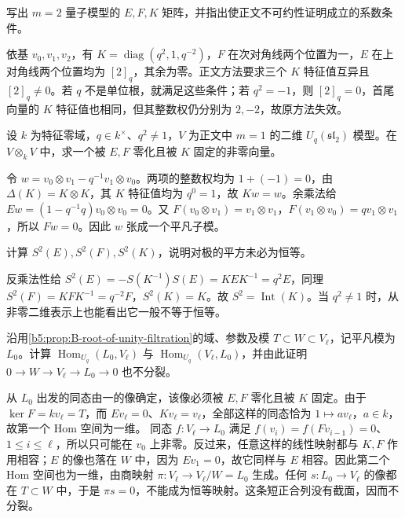 \begin{exercise}\label{b5:ex:B:02}
	写出 \(m=2\) 量子模型的 \(E,F,K\) 矩阵，并指出使正文不可约性证明成立的系数条件。
\end{exercise}
\begin{solution}
	依基 \(v_0,v_1,v_2\)，有 \(K=\operatorname{diag}(q^2,1,q^{-2})\)，\(F\) 在次对角线两个位置为一，\(E\) 在上对角线两个位置均为 \([2]_q\)，其余为零。正文方法要求三个 \(K\) 特征值互异且 \([2]_q\ne0\)。若 \(q\) 不是单位根，就满足这些条件；若 \(q^2=-1\)，则 \([2]_q=0\)，首尾向量的 \(K\) 特征值也相同，但其整数权仍分别为 \(2,-2\)，故原方法失效。
\end{solution}

\begin{exercise}\label{b5:ex:B:03}
	设 \(k\) 为特征零域，\(q\in k^\times\)、\(q^2\ne1\)，\(V\) 为正文中 \(m=1\) 的二维 \(U_q(\mathfrak{sl}_2)\) 模型。在 \(V\otimes_k V\) 中，求一个被 \(E,F\) 零化且被 \(K\) 固定的非零向量。
\end{exercise}
\begin{solution}
	令 \(w=v_0\otimes v_1-q^{-1}v_1\otimes v_0\)。两项的整数权均为 \(1+(-1)=0\)，由 \(\Delta(K)=K\otimes K\)，其 \(K\) 特征值均为 \(q^0=1\)，故 \(Kw=w\)。余乘法给 \(Ew=(1-q^{-1}q)v_0\otimes v_0=0\)。又 \(F(v_0\otimes v_1)=v_1\otimes v_1\)，\(F(v_1\otimes v_0)=qv_1\otimes v_1\)，所以 \(Fw=0\)。因此 \(w\) 张成一个平凡子模。
\end{solution}

\begin{exercise}\label{b5:ex:B:04}
	计算 \(S^2(E),S^2(F),S^2(K)\)，说明对极的平方未必为恒等。
\end{exercise}
\begin{solution}
	反乘法性给 \(S^2(E)=-S(K^{-1})S(E)=KEK^{-1}=q^2E\)，同理 \(S^2(F)=KFK^{-1}=q^{-2}F\)，\(S^2(K)=K\)。故 \(S^2=\operatorname{Int}(K)\)。当 \(q^2\ne1\) 时，从非零二维表示上也能看出它一般不等于恒等。
\end{solution}

\begin{exercise}\label{b5:ex:B:05}
	沿用\cref{b5:prop:B-root-of-unity-filtration}的域、参数及模 \(T\subset W\subset V_\ell\)，记平凡模为 \(L_0\)。计算 \(\operatorname{Hom}_{U_q}(L_0,V_\ell)\) 与 \(\operatorname{Hom}_{U_q}(V_\ell,L_0)\)，并由此证明 \(0\to W\to V_\ell\to L_0\to0\) 也不分裂。
\end{exercise}
\begin{solution}
	从 \(L_0\) 出发的同态由一的像确定，该像必须被 \(E,F\) 零化且被 \(K\) 固定。由于 \(\ker F=kv_\ell=T\)，而 \(Ev_\ell=0\)、\(Kv_\ell=v_\ell\)，全部这样的同态恰为 \(1\mapsto av_\ell\)，\(a\in k\)，故第一个 Hom 空间为一维。
	\ProseParagraphBreak
	同态 \(f:V_\ell\to L_0\) 满足 \(f(v_i)=f(Fv_{i-1})=0\)、\(1\le i\le\ell\)，所以只可能在 \(v_0\) 上非零。反过来，任意这样的线性映射都与 \(K,F\) 作用相容；\(E\) 的像也落在 \(W\) 中，因为 \(Ev_1=0\)，故它同样与 \(E\) 相容。因此第二个 Hom 空间也为一维，由商映射 \(\pi:V_\ell\to V_\ell/W=L_0\) 生成。任何 \(s:L_0\to V_\ell\) 的像都在 \(T\subset W\) 中，于是 \(\pi s=0\)，不能成为恒等映射。这条短正合列没有截面，因而不分裂。
\end{solution}

